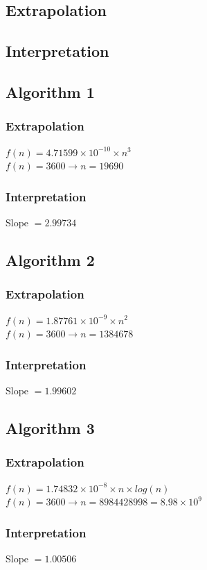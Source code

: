 \documentclass[a4paper,10pt]{article}
\begin{document}
		\subsection{Extrapolation}
			
		\subsection{Interpretation}
		\subsection{Algorithm 1}
			\subsubsection{Extrapolation}
				$f(n) = 4.71599 \times 10^{-10} \times n^3$\\
				$f(n) = 3600 \to n = 19690$\\
			\subsubsection{Interpretation}
				Slope $= 2.99734$
		
		\subsection{Algorithm 2}
			\subsubsection{Extrapolation}
				$f(n) = 1.87761 \times 10^{-9} \times n^2$\\
				$f(n) = 3600 \to n = 1384678$
			\subsubsection{Interpretation}
				Slope $= 1.99602$
		\subsection{Algorithm 3}
			\subsubsection{Extrapolation}
				$f(n) = 1.74832 \times 10^{-8} \times n \times log(n)$\\
				$f(n) = 3600 \to n = 8984428998 =8.98 \times 10^9$
			\subsubsection{Interpretation}
				Slope $= 1.00506$
\end{document}
